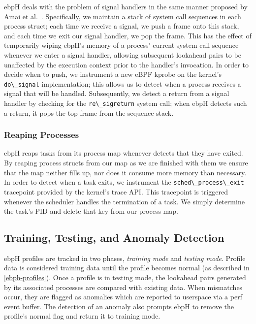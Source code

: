 \documentclass[
  12pt]{findlay}
\newcommand{\passthrough}[1]{#1}
\begin{document}
ebpH deals with the problem of signal handlers in the same manner
proposed by Amai et al.~\autocite{amai05}. Specifically, we maintain a
stack of system call sequences in each process struct; each time we
receive a signal, we push a frame onto this stack, and each time we exit
our signal handler, we pop the frame. This has the effect of temporarily
wiping ebpH's memory of a process' current system call sequence whenever
we enter a signal handler, allowing subsequent lookahead pairs to be
unaffected by the execution context prior to the handler's invocation.
In order to decide when to push, we instrument a new eBPF kprobe on the
kernel's \passthrough{\lstinline!do\_signal!} implementation; this
allows us to detect when a process receives a signal that will be
handled. Subsequently, we detect a return from a signal handler by
checking for the \passthrough{\lstinline!re\_sigreturn!} system call;
when ebpH detects such a return, it pops the top frame from the sequence
stack.

\hypertarget{reaping-processes}{%
\subsubsection{Reaping Processes}\label{reaping-processes}}

ebpH reaps tasks from its process map whenever detects that they have
exited. By reaping process structs from our map as we are finished with
them we ensure that the map neither fills up, nor does it consume more
memory than necessary. In order to detect when a task exits, we
instrument the \passthrough{\lstinline!sched\_process\_exit!} tracepoint
provided by the kernel's trace API. This tracepoint is triggered
whenever the scheduler handles the termination of a task. We simply
determine the task's PID and delete that key from our process map.

\hypertarget{training-testing-and-anomaly-detection}{%
\subsection{Training, Testing, and Anomaly
Detection}\label{training-testing-and-anomaly-detection}}

ebpH profiles are tracked in two phases, \emph{training mode} and
\emph{testing mode}. Profile data is considered training data until the
profile becomes normal (as described in \autoref{ebph-profiles}). Once a
profile is in testing mode, the lookahead pairs generated by its
associated processes are compared with existing data. When mismatches
occur, they are flagged as anomalies which are reported to userspace via
a perf event buffer. The detection of an anomaly also prompts ebpH to
remove the profile's normal flag and return it to training mode.
\end{document}
